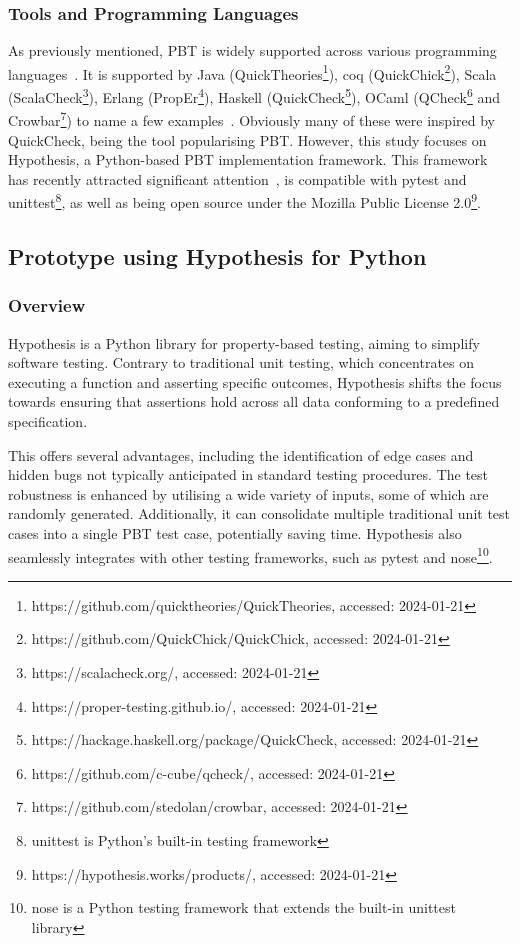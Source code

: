 \documentclass[runningheads]{llncs}
\begin{document}
\subsubsection{Tools and Programming Languages}
As previously mentioned, PBT is widely supported across various programming languages~\cite{Chen2022,Shi2023}. It is supported by Java (QuickTheories\footnote{https://github.com/quicktheories/QuickTheories, accessed: 2024-01-21}), coq (QuickChick\footnote{https://github.com/QuickChick/QuickChick, accessed: 2024-01-21}), Scala (ScalaCheck\footnote{https://scalacheck.org/, accessed: 2024-01-21}), Erlang (PropEr\footnote{https://proper-testing.github.io/, accessed: 2024-01-21}), Haskell (QuickCheck\footnote{https://hackage.haskell.org/package/QuickCheck, accessed: 2024-01-21}), OCaml (QCheck\footnote{https://github.com/c-cube/qcheck/, accessed: 2024-01-21} and Crowbar\footnote{https://github.com/stedolan/crowbar, accessed: 2024-01-21}) to name a few examples~\cite{MacIver2016,Padhye2019,Paraskevopoulou2015,Arts2008,Papadakis2011,Claessen2000}. Obviously many of these were inspired by QuickCheck, being the tool popularising PBT. However, this study focuses on Hypothesis, a Python-based PBT implementation framework. This framework has recently attracted significant attention~\cite{Corgozinho2023,MacIver2019}, is compatible with pytest and unittest\footnote{unittest is Python's built-in testing framework}, as well as being open source under the Mozilla Public License 2.0\footnote{https://hypothesis.works/products/, accessed: 2024-01-21}.

\subsection{Prototype using Hypothesis for Python}
\subsubsection{Overview}
Hypothesis is a Python library for property-based testing, aiming to simplify software testing. Contrary to traditional unit testing, which concentrates on executing a function and asserting specific outcomes, Hypothesis shifts the focus towards ensuring that assertions hold across all data conforming to a predefined specification.

This offers several advantages, including the identification of edge cases and hidden bugs not typically anticipated in standard testing procedures. The test robustness is enhanced by utilising a wide variety of inputs, some of which are randomly generated. Additionally, it can consolidate multiple traditional unit test cases into a single PBT test case, potentially saving time. Hypothesis also seamlessly integrates with other testing frameworks, such as pytest and nose\footnote{nose is a Python testing framework that extends the built-in unittest library}.
\end{document}
